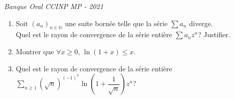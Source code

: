 \documentclass[a4paper,11pt]{article}
\newenvironment{questions}{\begin{enumerate}}{\end{enumerate}}
\begin{document}
 {\em Banque Oral CCINP MP - 2021}\\
\begin{questions}

\item
Soit $\left( a_{n}\right) _{n\in \mathbb{N}}$ une suite born\'{e}e telle que la s\'{e}rie $\displaystyle\sum a_{n}$ diverge.\\ Quel est le rayon de convergence de la s\'{e}rie enti\`{e}re $\displaystyle\sum a_{n}z^{n}$? Justifier. 
\item Montrer que $\forall x\geq 0$, $\ln (1+x)\leq x$.
\item Quel est le rayon de convergence de la s\'{e}rie enti\`{e}re $\displaystyle\sum \limits_{n\geqslant 1}^{}\left( \sqrt{n}\right)^{(-1)^n} \ln \left(1+\dfrac{1}{\sqrt{n}} \right)  z^{n}$? 
\end{questions}
\end{document}
